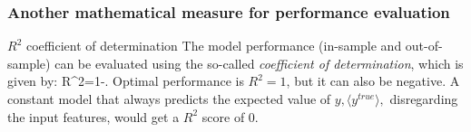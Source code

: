 \subsubsection{Another mathematical measure for performance evaluation}
\begin{mybox}{$R^2$ coefficient of determination}
	 The model performance (in-sample and out-of-sample) can be evaluated using the so-called \emph{coefficient of determination}, which is given by:
		\be
	\label{eq:errorR2}
	R^2=1-.
	\ee 
Optimal performance is $R^2=1$, but it can also be negative. A constant model that always predicts the expected value of $y, ⟨y^{true}⟩,$ disregarding the input features, would get a $R^2$ score of $0$.
\end{mybox}
















